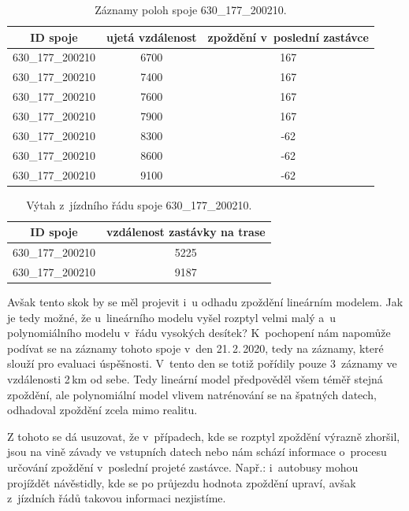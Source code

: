 \begin{center}
   \begin{table}[ht]
\centering
\begin{tabular}{|c|c|c|}
\hline
ID spoje & ujetá vzdálenost & zpoždění v~poslední zastávce \\ \hline \hline
630\_177\_200210 & 6700 & 167 \\ \hline
630\_177\_200210 & 7400 & 167 \\ \hline
630\_177\_200210 & 7600 & 167 \\ \hline
630\_177\_200210 & 7900 & 167 \\ \hline
630\_177\_200210 & 8300 & -62 \\ \hline
630\_177\_200210 & 8600 & -62 \\ \hline
630\_177\_200210 & 9100 & -62 \\ \hline
\end{tabular}
\label{table:825_samples}
\caption{Záznamy poloh spoje 630\_177\_200210.}
\end{table}
\end{center}


\begin{center}
   \begin{table}[ht]
\centering
\begin{tabular}{|c|c|}
\hline
ID spoje & vzdálenost zastávky na trase \\ \hline \hline
630\_177\_200210 & 5225 \\ \hline
630\_177\_200210 & 9187 \\ \hline
\end{tabular}
\label{tab:825_ride}
\caption{Výtah z~jízdního řádu spoje 630\_177\_200210.}
\end{table}
\end{center}


\bigbreak

Avšak tento skok by se měl projevit i~u odhadu zpoždění lineárním modelem. Jak je tedy možné, že u~lineárního modelu vyšel rozptyl velmi malý a~u polynomiálního modelu v~řádu vysokých desítek? K~pochopení nám napomůže podívat se na záznamy tohoto spoje v~den 21.\,2.\,2020, tedy na záznamy, které slouží pro evaluaci úspěšnosti. V~tento den se totiž pořídily pouze 3~záznamy ve vzdálenosti 2\,km od sebe. Tedy lineární model předpověděl všem téměř stejná zpoždění, ale polynomiální model vlivem natrénování se na špatných datech, odhadoval zpoždění zcela mimo realitu.


\bigbreak

Z tohoto se dá usuzovat, že v~případech, kde se rozptyl zpoždění výrazně zhoršil, jsou na vině závady ve vstupních datech nebo nám schází informace o~procesu určování zpoždění v~poslední projeté zastávce. Např.: i~autobusy mohou projíždět návěstidly, kde se po průjezdu hodnota zpoždění upraví, avšak z~jízdních řádů takovou informaci nezjistíme.


